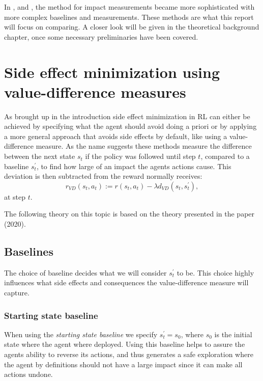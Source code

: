\documentclass[12pt,A4]{report}
\theoremstyle{definition}
\begin{document}
In \autocite{Krakovna et al 2019}, \autocite{Krakovna et al 2020} and \autocite{Turner et al 2020}, the method for impact measurements became more sophisticated with more complex baselines and measurements. These methods are what this report will focus on comparing. A closer look will be given in the theoretical background chapter, once some necessary preliminaries have been covered.


\section{Side effect minimization using value-difference measures}
As brought up in the introduction side effect minimization in RL can either be achieved by specifying what the agent should avoid doing a priori or by applying a more general approach that avoids side effects by default, like using a value-difference measure. As the name suggests these methods measure the difference between the next state $s_t$ if the policy was followed until step $t$, compared to a baseline $s_t^\prime$, to find how large of an impact the agents actions cause. This deviation is then subtracted from the reward normally receives:
\[ r_{VD}(s_t,a_t) := r(s_t,a_t) - \lambda d_{VD}(s_t, s_t^\prime), \]
at step $t$. 

The following theory on this topic is based on the theory presented in the paper \autocite{Krakovna et al.}(2020).


\subsection{Baselines}
The choice of baseline decides what we will consider $s^{\prime}_t$ to be. This choice highly influences what side effects and consequences the value-difference measure will capture.

\subsubsection{Starting state baseline}
When using the \textit{starting state baseline} we specify $s^{\prime}_t = s_0$, where $s_0$ is the initial state where the agent where deployed. Using this baseline helps to assure the agents ability to reverse its actions, and thus generates a safe exploration where the agent by definitions should not have a large impact since it can make all actions undone. %
\end{document}
